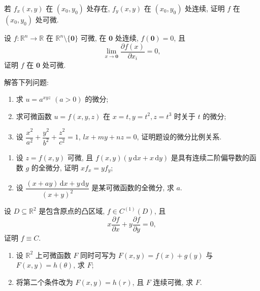 \documentclass[../../数学分析培优讲义.tex]{subfiles}
\begin{document}
\begin{example}
若 $f_x(x,y)$ 在 $(x_0,y_0)$ 处存在, $f_y(x,y)$ 在 $(x_0,y_0)$ 处连续, 证明 $f$ 在 $(x_0,y_0)$ 处可微.
\end{example}
\exampleblank

\begin{example}
设 $f:\mathbb{R}^n\to\mathbb{R}$ 在 $\mathbb{R}^n\setminus\{\bm{0}\}$ 可微, 在 $\bm{0}$ 处连续, $f(\bm{0})=0$, 且
\[
    \lim\limits_{x\to\bm{0}}\dfrac{\partial f(x)}{\partial x_i}=0,
\]
证明 $f$ 在 $\bm{0}$ 处可微.
\end{example}
\exampleblank

\begin{example}
解答下列问题:
\begin{enumerate}[label=(\arabic*)]
    \item 求 $u=a^{xyz}$ $(a>0)$ 的微分;
    \item 求可微函数 $u=f(x,y,z)$ 在 $x=t,y=t^2,z=t^3$ 时关于 $t$ 的微分;
    \item 设 $\dfrac{x^2}{a^2}+\dfrac{y^2}{b^2}+\dfrac{z^2}{c^2}=1$, $lx+my+nz=0$, 证明题设的微分比例关系.
\end{enumerate}
\end{example}
\exampleblank

\begin{example}
\begin{enumerate}[label=(\arabic*)]
    \item 设 $z=f(x,y)$ 可微, 且 $f(x,y)(y\,\mathrm{d}x+x\,\mathrm{d}y)$ 是具有连续二阶偏导数的函数 $g$ 的全微分, 证明 $xf_x=yf_y$;
    \item 设 $\displaystyle\dfrac{(x+ay)\,\mathrm{d}x+y\,\mathrm{d}y}{(x+y)^2}$ 是某可微函数的全微分, 求 $a$.
\end{enumerate}
\end{example}
\exampleblank

\begin{example}
设 $D\subseteq\mathbb{R}^2$ 是包含原点的凸区域, $f\in C^{(1)}(D)$, 且
\[
    x\dfrac{\partial f}{\partial x}+y\dfrac{\partial f}{\partial y}=0,
\]
证明 $f\equiv C$.
\end{example}
\exampleblank

\begin{example}
\begin{enumerate}[label=(\arabic*)]
    \item 设 $\mathbb{R}^2$ 上可微函数 $F$ 同时可写为 $F(x,y)=f(x)+g(y)$ 与 $F(x,y)=h(\theta)$, 求 $F$;
    \item 将第二个条件改为 $F(x,y)=h(r)$, 且 $F$ 连续可微, 求 $F$.
\end{enumerate}
\end{example}
\exampleblank
\end{document}
